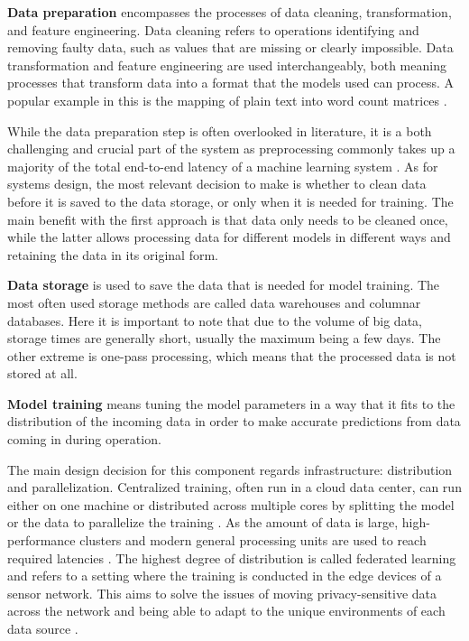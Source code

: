 \textbf{Data preparation} encompasses the processes of data cleaning, transformation, and feature engineering. Data cleaning refers to operations identifying and removing faulty data, such as values that are missing or clearly impossible. Data transformation and feature engineering are used interchangeably, both meaning processes that transform data into a format that the models used can process. A popular example in this is the mapping of plain text into word count matrices \cite{dapbook}.

While the data preparation step is often overlooked in literature,
it is a both challenging and crucial part of the system as preprocessing commonly takes up a majority of the total end-to-end latency of a machine learning system \cite{adaptivelearningsystems}. As for systems design, the most relevant decision to make is whether to clean data before it is saved to the data storage, or only when it is  needed for training. The main benefit with the first approach is that data only needs to be cleaned once, while the latter allows processing data for different models in different ways and retaining the data in its original form.

\textbf{Data storage} is used to save the data that is needed for model training. The most often used storage methods are called data warehouses and columnar databases. Here it is important to note that due to the volume of big data, storage times are generally short, usually the maximum being a few days. The other extreme is one-pass processing, which means that the processed data is not stored at all.

\textbf{Model training} means tuning the model parameters in a way that it fits to the distribution of the incoming data in order to make accurate predictions from data coming in during operation.

The main design decision for this component regards infrastructure: distribution and parallelization. Centralized training, often run in a cloud data center, can run either on one machine or distributed across multiple cores by splitting the model or the data to parallelize the training \cite{ben-nunDemystifyingParallelDistributed2019}. As the amount of data is large, high-performance clusters and modern general processing units are used to reach required latencies \cite{iotsurvey}. The highest degree of distribution is called federated learning and refers to a setting where the training is conducted in the edge devices of a sensor network. This aims to solve the issues of moving privacy-sensitive data across the network and being able to adapt to the unique environments of each data source \cite{iotsurvey}.


